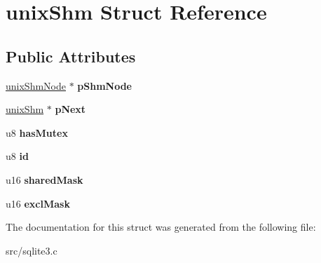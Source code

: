 \hypertarget{structunix_shm}{\section{unix\-Shm Struct Reference}
\label{structunix_shm}
}
\subsection*{Public Attributes}
\begin{DoxyCompactItemize}
\item 
\hypertarget{structunix_shm_a8ab421232d29e3237262ef46775199ee}{\hyperlink{structunix_shm_node}{unix\-Shm\-Node} $\ast$ {\bfseries p\-Shm\-Node}}\label{structunix_shm_a8ab421232d29e3237262ef46775199ee}

\item 
\hypertarget{structunix_shm_a0d5229cf734581f51cdf16dd7d5ce93a}{\hyperlink{structunix_shm}{unix\-Shm} $\ast$ {\bfseries p\-Next}}\label{structunix_shm_a0d5229cf734581f51cdf16dd7d5ce93a}

\item 
\hypertarget{structunix_shm_a43903be262472299c5eee917ba7c523c}{u8 {\bfseries has\-Mutex}}\label{structunix_shm_a43903be262472299c5eee917ba7c523c}

\item 
\hypertarget{structunix_shm_a88a5e7161ff31f85740dbfc0ba7ad38a}{u8 {\bfseries id}}\label{structunix_shm_a88a5e7161ff31f85740dbfc0ba7ad38a}

\item 
\hypertarget{structunix_shm_a768aa62a6ea2bd91ab60a34d7654811b}{u16 {\bfseries shared\-Mask}}\label{structunix_shm_a768aa62a6ea2bd91ab60a34d7654811b}

\item 
\hypertarget{structunix_shm_ac6f786d95952e51cab941cbfb9243c8e}{u16 {\bfseries excl\-Mask}}\label{structunix_shm_ac6f786d95952e51cab941cbfb9243c8e}

\end{DoxyCompactItemize}


The documentation for this struct was generated from the following file\-:\begin{DoxyCompactItemize}
\item 
src/sqlite3.\-c\end{DoxyCompactItemize}
